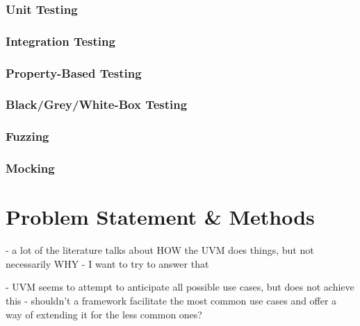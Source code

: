 \documentclass[12pt]{report}
\begin{document}
\subsection{Unit Testing} %

\subsection{Integration Testing} %

\subsection{Property-Based Testing} %

\subsection{Black/Grey/White-Box Testing} %

\subsection{Fuzzing} %

\subsection{Mocking} %

\chapter{Problem Statement \& Methods} %

- a lot of the literature talks about HOW the UVM does things, but not necessarily WHY
- I want to try to answer that

- UVM seems to attempt to anticipate all possible use cases, but does not achieve this
- shouldn't a framework facilitate the most common use cases and offer a way of extending it for the less common ones?
\end{document}
